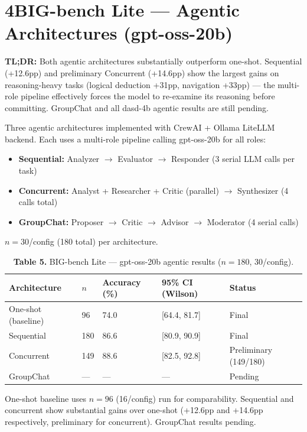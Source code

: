 \documentclass[11pt,letterpaper]{article}
\begin{document}
\vspace{0.4cm}

\section*{4\quad BIG-bench Lite --- Agentic Architectures (gpt-oss-20b)}

\noindent\textbf{TL;DR:} Both agentic architectures substantially outperform one-shot. Sequential (+12.6pp) and preliminary Concurrent (+14.6pp) show the largest gains on reasoning-heavy tasks (logical deduction +31pp, navigation +33pp) --- the multi-role pipeline effectively forces the model to re-examine its reasoning before committing. GroupChat and all dasd-4b agentic results are still pending.

\vspace{0.2cm}

Three agentic architectures implemented with CrewAI + Ollama LiteLLM backend. Each uses a multi-role pipeline calling gpt-oss-20b for all roles:
\begin{itemize}
  \item \textbf{Sequential:} Analyzer $\to$ Evaluator $\to$ Responder (3 serial LLM calls per task)
  \item \textbf{Concurrent:} Analyst + Researcher + Critic (parallel) $\to$ Synthesizer (4 calls total)
  \item \textbf{GroupChat:} Proposer $\to$ Critic $\to$ Advisor $\to$ Moderator (4 serial calls)
\end{itemize}

$n=30$/config (180 total) per architecture.

\vspace{0.3cm}

\begin{table}[h!]
\centering
\caption*{\textbf{Table 5.} BIG-bench Lite --- gpt-oss-20b agentic results ($n=180$, 30/config).}
\begin{tabular}{l R{0.7cm} R{1.5cm} R{2.8cm} l}
\toprule
\textbf{Architecture} & \textbf{$n$} & \textbf{Accuracy (\%)} & \textbf{95\% CI (Wilson)} & \textbf{Status} \\
\midrule
One-shot (baseline) & 96 & 74.0 & [64.4, 81.7] & \textcolor{green!50!black}{Final} \\
 Sequential & 180 & 86.6 & [80.9, 90.9] & \textcolor{green!50!black}{Final} \\
 Concurrent & 149 & 88.6 & [82.5, 92.8] & \textcolor{prelim}{Preliminary (149/180)} \\
GroupChat & --- & --- & --- & \textcolor{prelim}{Pending} \\
\bottomrule
\end{tabular}

\vspace{4pt}
{\footnotesize\textcolor{notegray}{One-shot baseline uses $n=96$ (16/config) run for comparability. Sequential and concurrent show substantial gains over one-shot (+12.6pp and +14.6pp respectively, preliminary for concurrent). GroupChat results pending.}}
\end{table}
\end{document}
